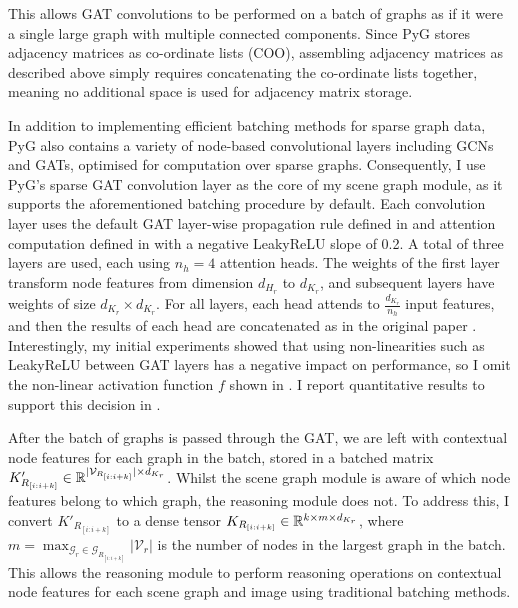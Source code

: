 This allows GAT convolutions to be performed on a batch of graphs as if it were a single large graph with multiple connected components. Since PyG stores adjacency matrices as co-ordinate lists (COO), assembling adjacency matrices as described above simply requires concatenating the co-ordinate lists together, meaning no additional space is used for adjacency matrix storage.

In addition to implementing efficient batching methods for sparse graph data, PyG also contains a variety of node-based convolutional layers including GCNs and GATs, optimised for computation over sparse graphs. Consequently, I use PyG's sparse GAT convolution layer as the core of my scene graph module, as it supports the aforementioned batching procedure by default. Each convolution layer uses the default GAT layer-wise propagation rule defined in \equationautorefname{ \ref{equation:gat_propagation_rule}} and attention computation defined in \equationautorefname{ \ref{equation:gat_attention_computation}} with a negative LeakyReLU slope of 0.2. A total of three layers are used, each using \(n_h = 4\) attention heads. The weights of the first layer transform node features from dimension \(d_{H_r}\) to \(d_{K_r}\), and subsequent layers have weights of size \(d_{K_r} \times d_{K_r}\). For all layers, each head attends to \(\frac{d_{K_r}}{n_h}\) input features, and then the results of each head are concatenated as in the original paper \cite{velivckovic2017graph}. Interestingly, my initial experiments showed that using non-linearities such as LeakyReLU between GAT layers has a negative impact on performance, so I omit the non-linear activation function \(f\) shown in \equationautorefname{ \ref{equation:gat_propagation_rule}}. I report quantitative results to support this decision in \sectionautorefname{ \ref{subsec:scene_graph_module_ablations}}.
 
After the batch of graphs is passed through the GAT, we are left with contextual node features for each graph in the batch, stored in a batched matrix \(K'_{R_{[i:i+k]}} \in \mathbb{R}^{|\mathcal{V}_{R_{[i:i+k]}}| \times d_{K_r}}\). Whilst the scene graph module is aware of which node features belong to which graph, the reasoning module does not. To address this, I convert \(K'_{R_{[i:i+k]}}\) to a dense tensor \(K_{R_{[i:i+k]}} \in \mathbb{R}^{k \times m \times d_{K_r}}\), where \(m = \max_{\mathcal{G}_r \in \mathcal{G}_{R_{[i:i+k]}}} |\mathcal{V}_r|\) is the number of nodes in the largest graph in the batch. This allows the reasoning module to perform reasoning operations on contextual node features for each scene graph and image using traditional batching methods.
 
